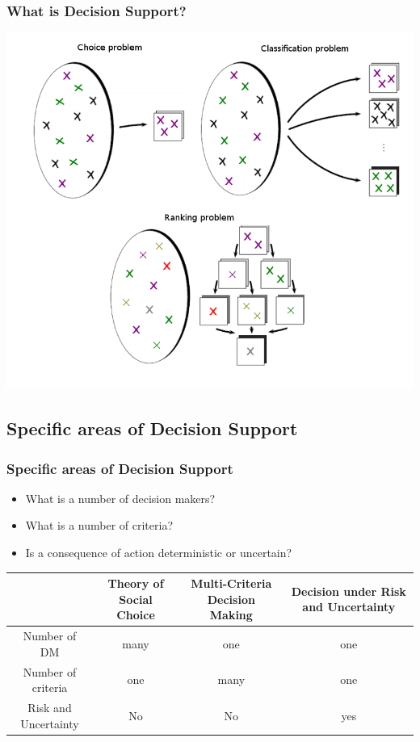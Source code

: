 \documentclass{beamer}
\begin{document}
\begin{frame}
\frametitle{What is Decision Support?}
\begin{center}
\includegraphics[scale=0.34]{problems.png}
\end{center}
\end{frame}


\subsection{Specific areas of Decision Support}
\begin{frame}
\frametitle{Specific areas of Decision Support}
\begin{itemize}
\item What is a number of decision makers?
\item What is a number of criteria?
\item Is a consequence of action deterministic or uncertain?
\end{itemize}
\begin{table}
\begin{tabular}{c|c|c|c}
    & Theory of Social Choice & Multi-Criteria Decision Making & Decision under Risk and Uncertainty \\
    \hline
    Number of DM & many & one & one \\
    \hline
    Number of criteria & one & many & one \\
    \hline
    Risk and Uncertainty & No & No & yes\\
    \hline

\end{tabular}
\end{table}
\end{frame}
\end{document}
